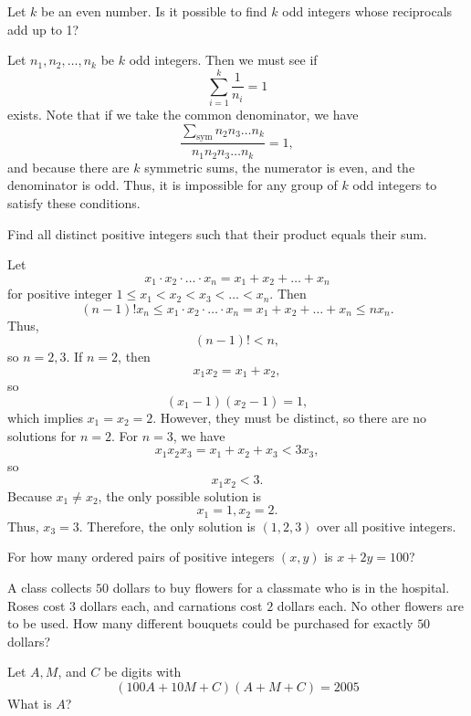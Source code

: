 \documentclass[mast]{lucky}
\begin{document}
\begin{exam}
Let $k$ be an even number. Is it possible to find $k$ odd integers whose reciprocals add up to 1?
\end{exam}
\begin{sol}
Let $n_1,n_2,\ldots,n_k$ be $k$ odd integers. Then we must see if
$$\sum_{i=1}^k \frac{1}{n_i} = 1$$
exists. Note that if we take the common denominator, we have
$$\frac{\sum_{\text{sym}} n_2n_3\ldots n_k}{n_1n_2n_3\ldots n_k} = 1,$$
and because there are $k$ symmetric sums, the numerator is even, and the denominator is odd. Thus, it is impossible for any group of $k$ odd integers to satisfy these conditions.
\end{sol}
\begin{exam}
Find all distinct positive integers such that their product equals their sum.
\end{exam}
\begin{sol}
Let
$$x_1 \cdot x_2 \cdot \ldots \cdot x_n = x_1 + x_2 + \ldots + x_n$$
for positive integer $1\le x_1 < x_2 < x_3 < \ldots < x_n$. Then
$$(n-1)! x_n \le x_1 \cdot x_2 \cdot \ldots \cdot x_n = x_1 + x_2 + \ldots + x_n \le nx_n.$$
Thus,
$$(n-1)! < n,$$
so $n=2,3$. If $n=2$, then
$$x_1x_2 = x_1 + x_2,$$
so
$$(x_1-1)(x_2-1) = 1,$$
which implies $x_1=x_2=2$. However, they must be distinct, so there are no solutions for $n=2$. For $n=3$, we have
$$x_1x_2x_3 = x_1+x_2+x_3<3x_3,$$
so
$$x_1x_2<3.$$
Because $x_1 \neq x_2$, the only possible solution is
$$x_1=1,x_2=2.$$
Thus, $x_3=3$. Therefore, the only solution is $(1,2,3)$ over all positive integers.
\end{sol}
\problems
{}


\begin{prob}[AMC 12A 2004/3]{1}
For how many ordered pairs of positive integers $(x,y)$ is $x+2y=100$?
\end{prob}

\begin{prob}[AMC 12B 2008/5]{1}
A class collects $50$ dollars to buy flowers for a classmate who is in the hospital. Roses cost $3$ dollars each, and carnations cost $2$ dollars each. No other flowers are to be used. How many different bouquets could be purchased for exactly $50$ dollars?
\end{prob}

\begin{prob}[AMC 12A 2005/8]{2}
Let $A,M$, and $C$ be digits with
\[(100A+10M+C)(A+M+C) = 2005\]
What is $A$?

\end{prob}
\end{document}
